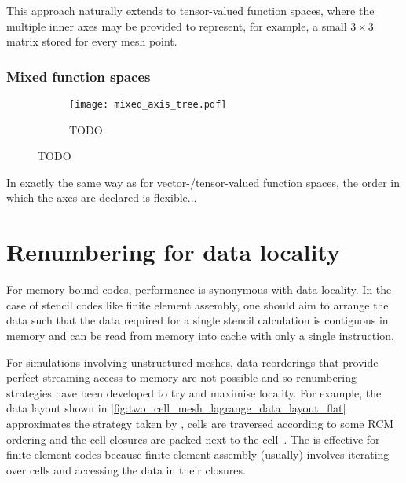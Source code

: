 \documentclass[thesis]{subfiles}
\begin{document}

This approach naturally extends to tensor-valued function spaces, where the multiple inner axes may be provided to represent, for example, a small $3 \times 3$ matrix stored for every mesh point.

\subsubsection{Mixed function spaces}

\begin{figure}
  \centering
  \begin{subfigure}{\textwidth}
    \centering
    \texttt{[image: mixed\_axis\_tree.pdf]}
    \caption{TODO}
    \label{fig:mixed_axis_tree}
  \end{subfigure}

\end{figure}


In exactly the same way as for vector-/tensor-valued function spaces, the order in which the axes are declared is flexible...

\section{Renumbering for data locality}
\label{sec:renumbering}

For memory-bound codes, performance is synonymous with data locality.
In the case of stencil codes like finite element assembly, one should aim to arrange the data such that the data required for a single stencil calculation is contiguous in memory and can be read from memory into cache with only a single instruction.

For simulations involving unstructured meshes, data reorderings that provide perfect streaming access to memory are not possible and so renumbering strategies have been developed to try and maximise locality.
For example, the data layout shown in \cref{fig:two_cell_mesh_lagrange_data_layout_flat} approximates the strategy taken by , cells are traversed according to some RCM ordering and the cell closures are packed next to the cell~\cite{langeEfficientMeshManagement2016}.
The is effective for finite element codes because finite element assembly (usually) involves iterating over cells and accessing the data in their closures.
\end{document}

